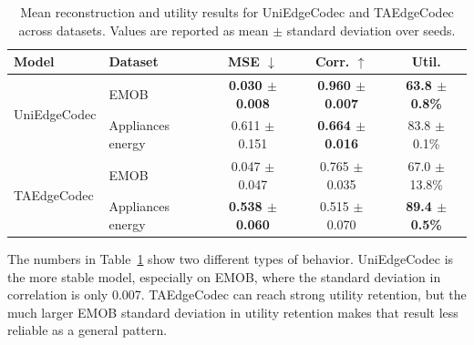 \begin{table}[htbp]
\centering
\small
\caption{Mean reconstruction and utility results for UniEdgeCodec and TAEdgeCodec across datasets. Values are reported as mean $\pm$ standard deviation over seeds.}
\label{tab:uni-ta-summary}
\begin{tabular}{llccc}
\toprule
\textbf{Model} & \textbf{Dataset} & \textbf{MSE} $\downarrow$ & \textbf{Corr.} $\uparrow$ & \textbf{Util.} \\
\midrule
\multirow{2}{*}{UniEdgeCodec} & EMOB              & \textbf{0.030 $\pm$ 0.008} & \textbf{0.960 $\pm$ 0.007} & \textbf{63.8 $\pm$ 0.8\%} \\
                              & Appliances energy & 0.611 $\pm$ 0.151          & \textbf{0.664 $\pm$ 0.016}          & 83.8 $\pm$ 0.1\% \\
\midrule
\multirow{2}{*}{TAEdgeCodec}  & EMOB              & 0.047 $\pm$ 0.047 & 0.765 $\pm$ 0.035 & 67.0 $\pm$ 13.8\% \\
                              & Appliances energy & \textbf{0.538 $\pm$ 0.060}          & 0.515 $\pm$ 0.070          & \textbf{89.4 $\pm$ 0.5\%} \\
\bottomrule
\end{tabular}
\end{table}

The numbers in Table~\ref{tab:uni-ta-summary} show two different types of behavior. UniEdgeCodec is the more stable model, especially on EMOB, where the standard deviation in correlation is only 0.007. TAEdgeCodec can reach strong utility retention, but the much larger EMOB standard deviation in utility retention makes that result less reliable as a general pattern. 

